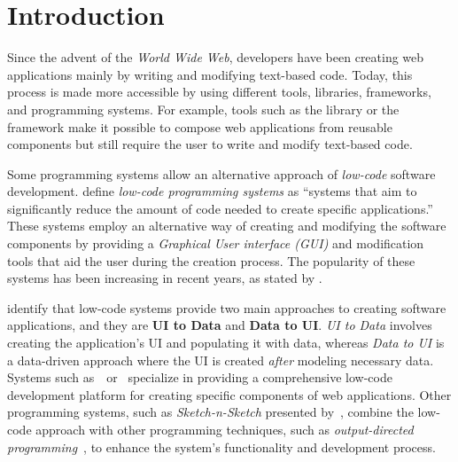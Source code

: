 \chapter*{Introduction}

Since the advent of the \emph{World Wide Web}, developers have been creating web applications mainly by writing and modifying text-based code.
Today, this process is made more accessible by using different tools, libraries, frameworks, and programming systems.
For example, tools such as the \citet{react} library or the \citet{vuejs} framework make it possible to compose web applications from reusable components but still require the user to write and modify text-based code.

Some programming systems allow an alternative approach of \emph{low-code} software development.
\citet{Pinho_Aguiar_Amaral_2023} define \emph{low-code programming systems} as ``systems that aim to significantly reduce the amount of code needed to create specific applications.''
These systems employ an alternative way of creating and modifying the software components by providing a \emph{Graphical User interface (GUI)} and modification tools that aid the user during the creation process.
The popularity of these systems has been increasing in recent years, as stated by \citet{Sahay_Indamutsa_Di}.

\citet{Sahay_Indamutsa_Di} identify that low-code systems provide two main approaches to creating software applications, and they are \textbf{UI to Data} and \textbf{Data to UI}.
\emph{UI to Data} involves creating the application's UI and populating it with data, whereas \emph{Data to UI} is a data-driven approach where the UI is created \emph{after} modeling necessary data.
Systems such as~\citet{mendix}~or~\citet{darklang} specialize in providing a comprehensive low-code development platform for creating specific components of web applications.
Other programming systems, such as \emph{Sketch-n-Sketch} presented by~\citet{sketch-and-sketch}, combine the low-code approach
with other programming techniques, such as \emph{output-directed programming}~\cite{output-directed-programming}, to enhance the system's functionality and development process.

